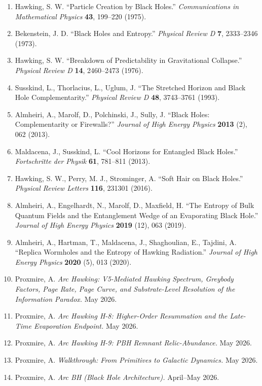 \documentclass[11pt,a4paper]{article}
\begin{document}
\begin{enumerate}[leftmargin=*,itemsep=2pt]
  \item Hawking, S. W. ``Particle Creation by Black Holes.'' \emph{Communications in Mathematical Physics} \textbf{43}, 199--220 (1975).
  \item Bekenstein, J. D. ``Black Holes and Entropy.'' \emph{Physical Review D} \textbf{7}, 2333--2346 (1973).
  \item Hawking, S. W. ``Breakdown of Predictability in Gravitational Collapse.'' \emph{Physical Review D} \textbf{14}, 2460--2473 (1976).
  \item Susskind, L., Thorlacius, L., Uglum, J. ``The Stretched Horizon and Black Hole Complementarity.'' \emph{Physical Review D} \textbf{48}, 3743--3761 (1993).
  \item Almheiri, A., Marolf, D., Polchinski, J., Sully, J. ``Black Holes: Complementarity or Firewalls?'' \emph{Journal of High Energy Physics} \textbf{2013} (2), 062 (2013).
  \item Maldacena, J., Susskind, L. ``Cool Horizons for Entangled Black Holes.'' \emph{Fortschritte der Physik} \textbf{61}, 781--811 (2013).
  \item Hawking, S. W., Perry, M. J., Strominger, A. ``Soft Hair on Black Holes.'' \emph{Physical Review Letters} \textbf{116}, 231301 (2016).
  \item Almheiri, A., Engelhardt, N., Marolf, D., Maxfield, H. ``The Entropy of Bulk Quantum Fields and the Entanglement Wedge of an Evaporating Black Hole.'' \emph{Journal of High Energy Physics} \textbf{2019} (12), 063 (2019).
  \item Almheiri, A., Hartman, T., Maldacena, J., Shaghoulian, E., Tajdini, A. ``Replica Wormholes and the Entropy of Hawking Radiation.'' \emph{Journal of High Energy Physics} \textbf{2020} (5), 013 (2020).
  \item Proxmire, A. \emph{Arc Hawking: V5-Mediated Hawking Spectrum, Greybody Factors, Page Rate, Page Curve, and Substrate-Level Resolution of the Information Paradox.} May 2026.
  \item[{[10a]}] Proxmire, A. \emph{Arc Hawking H-8: Higher-Order Resummation and the Late-Time Evaporation Endpoint.} May 2026.
  \item[{[10b]}] Proxmire, A. \emph{Arc Hawking H-9: PBH Remnant Relic-Abundance.} May 2026.
  \item[{[10c]}] Proxmire, A. \emph{Walkthrough: From Primitives to Galactic Dynamics.} May 2026.
  \item[{[11]}] Proxmire, A. \emph{Arc BH (Black Hole Architecture).} April--May 2026.

\end{enumerate}
\end{document}
